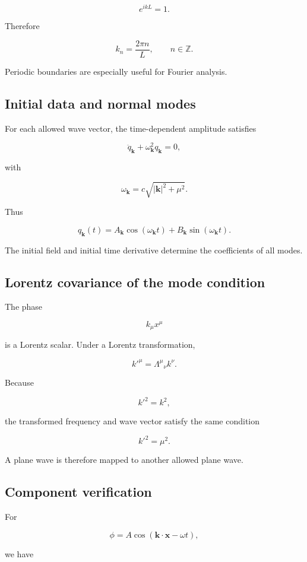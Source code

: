 \[
e^{ikL}=1.
\]

Therefore

\[
\boxed{
k_{n}=\frac{2\pi n}{L},
\qquad
n\in\mathbb{Z}
}.
\]

Periodic boundaries are especially useful for Fourier analysis.

\subsection{Initial data and normal modes}

For each allowed wave vector, the time-dependent amplitude satisfies

\[
\ddot q_{\mathbf{k}}
+
\omega_{\mathbf{k}}^{2}
q_{\mathbf{k}}
=0,
\]

with

\[
\omega_{\mathbf{k}}
=
c\sqrt{|\mathbf{k}|^{2}+\mu^{2}}.
\]

Thus

\[
q_{\mathbf{k}}(t)
=
A_{\mathbf{k}}
\cos(\omega_{\mathbf{k}}t)
+
B_{\mathbf{k}}
\sin(\omega_{\mathbf{k}}t).
\]

The initial field and initial time derivative determine the coefficients of all modes.

\subsection{Lorentz covariance of the mode condition}

The phase

\[
k_{\mu}x^{\mu}
\]

is a Lorentz scalar. Under a Lorentz transformation,

\[
k'^{\mu}
=
\Lambda^{\mu}{}_{\nu}k^{\nu}.
\]

Because

\[
k'^{2}=k^{2},
\]

the transformed frequency and wave vector satisfy the same condition

\[
k'^{2}=\mu^{2}.
\]

A plane wave is therefore mapped to another allowed plane wave.

\subsection{Component verification}

For

\[
\phi
=
A\cos(\mathbf{k}\cdot\mathbf{x}-\omega t),
\]

we have

